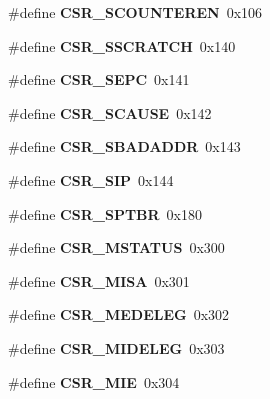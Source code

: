 \begin{DoxyCompactItemize}
\#define {\bfseries C\+S\+R\+\_\+\+S\+C\+O\+U\+N\+T\+E\+R\+EN}~0x106
\item 
\mbox{\label{riscv-utility_8h_a545aa444d12109ef8e961ba29eb3ea54}} 
\#define {\bfseries C\+S\+R\+\_\+\+S\+S\+C\+R\+A\+T\+CH}~0x140
\item 
\mbox{\label{riscv-utility_8h_a3981cba40ee737a2f7cf4228b2bdbb67}} 
\#define {\bfseries C\+S\+R\+\_\+\+S\+E\+PC}~0x141
\item 
\mbox{\label{riscv-utility_8h_a49e424a4449b3192d35ca1133e8f5dc2}} 
\#define {\bfseries C\+S\+R\+\_\+\+S\+C\+A\+U\+SE}~0x142
\item 
\mbox{\label{riscv-utility_8h_ac46f5b5ff617c14b42ed38307028217c}} 
\#define {\bfseries C\+S\+R\+\_\+\+S\+B\+A\+D\+A\+D\+DR}~0x143
\item 
\mbox{\label{riscv-utility_8h_ac79e54d601a25a8eed4e0c985fd30315}} 
\#define {\bfseries C\+S\+R\+\_\+\+S\+IP}~0x144
\item 
\mbox{\label{riscv-utility_8h_aad33afbadb5582d0603771fda6e04e6b}} 
\#define {\bfseries C\+S\+R\+\_\+\+S\+P\+T\+BR}~0x180
\item 
\mbox{\label{riscv-utility_8h_a7086e667c65affe87d2c32115193d736}} 
\#define {\bfseries C\+S\+R\+\_\+\+M\+S\+T\+A\+T\+US}~0x300
\item 
\mbox{\label{riscv-utility_8h_aaa62902f21282250fd975372f9e5e24e}} 
\#define {\bfseries C\+S\+R\+\_\+\+M\+I\+SA}~0x301
\item 
\mbox{\label{riscv-utility_8h_ab3139a6af26d85bf8d30330397d4a8c0}} 
\#define {\bfseries C\+S\+R\+\_\+\+M\+E\+D\+E\+L\+EG}~0x302
\item 
\mbox{\label{riscv-utility_8h_ae447b7b078204874a2606d32097e017a}} 
\#define {\bfseries C\+S\+R\+\_\+\+M\+I\+D\+E\+L\+EG}~0x303
\item 
\mbox{\label{riscv-utility_8h_ae75a38ea833c5507d942fad1c98132e1}} 
\#define {\bfseries C\+S\+R\+\_\+\+M\+IE}~0x304

\end{DoxyCompactItemize}
